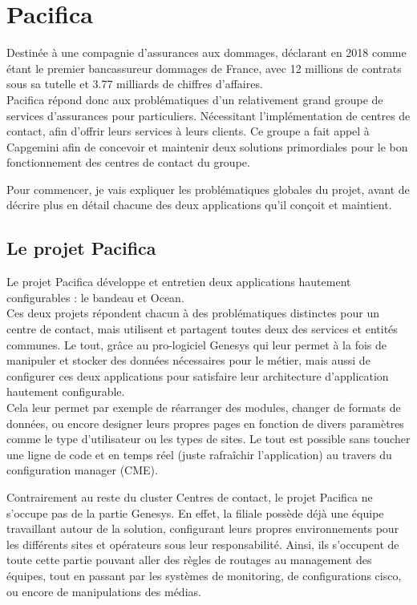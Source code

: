 \documentclass{rapport}
\begin{document}
\newpage

\section{Pacifica}

Destinée à une compagnie d'assurances aux dommages, déclarant en 2018 comme étant le premier bancassureur dommages de France, avec 12 millions de contrats sous sa tutelle et 3.77 milliards de chiffres d'affaires.\\

Pacifica répond donc aux problématiques d'un relativement grand groupe de services d'assurances pour particuliers. Nécessitant l'implémentation de centres de contact, afin d'offrir leurs services à leurs clients. Ce groupe a fait appel à Capgemini afin de concevoir et maintenir deux solutions primordiales pour le bon fonctionnement des centres de contact du groupe.

Pour commencer, je vais expliquer les problématiques globales du projet, avant de décrire plus en détail chacune des deux applications qu'il conçoit et maintient.


\subsection{Le projet Pacifica}

Le projet Pacifica développe et entretien deux applications hautement configurables : le bandeau et Ocean.\\
Ces deux projets répondent chacun à des problématiques distinctes pour un centre de contact, mais utilisent et partagent toutes deux des services et entités communes. Le tout, grâce au pro-logiciel Genesys qui leur permet à la fois de manipuler et stocker des données nécessaires pour le métier, mais aussi de configurer ces deux applications pour satisfaire leur architecture d'application hautement configurable.\\
Cela leur permet par exemple de réarranger des modules, changer de formats de données, ou encore designer leurs propres pages en fonction de divers paramètres comme le type d'utilisateur ou les types de sites. Le tout est possible sans toucher une ligne de code et en temps réel (juste rafraîchir l'application) au travers du configuration manager (CME).

Contrairement au reste du cluster Centres de contact, le projet Pacifica ne s'occupe pas de la partie Genesys. En effet, la filiale possède déjà une équipe travaillant autour de la solution, configurant leurs propres environnements pour les différents sites et opérateurs sous leur responsabilité. Ainsi, ils s'occupent de toute cette partie pouvant aller des règles de routages au management des équipes, tout en passant par les systèmes de monitoring, de configurations cisco, ou encore de manipulations des médias.\\
\end{document}
